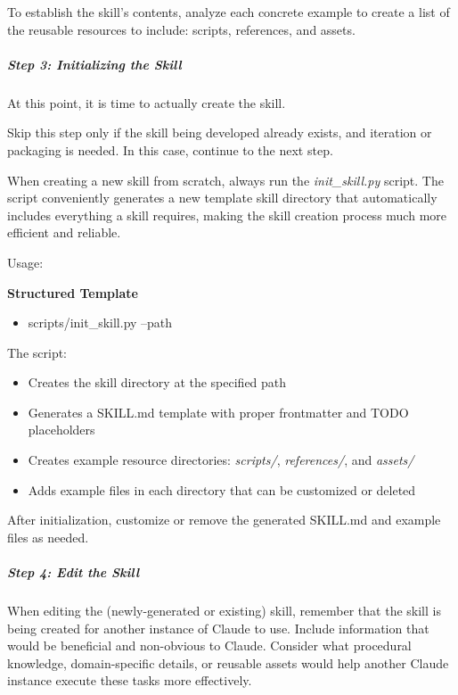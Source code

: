 \documentclass[11pt]{article}
\begin{document}
To establish the skill's contents, analyze each concrete example to create a list of the reusable resources to include: scripts, references, and assets.


\subparagraph{Step 3: Initializing the Skill}\mbox{}\par

At this point, it is time to actually create the skill.


Skip this step only if the skill being developed already exists, and iteration or packaging is needed. In this case, continue to the next step.


When creating a new skill from scratch, always run the \emph{init\_\allowbreak{}skill.py} script. The script conveniently generates a new template skill directory that automatically includes everything a skill requires, making the skill creation process much more efficient and reliable.


Usage:


\textbf{Structured Template}
\begin{itemize}[leftmargin=*,itemsep=2pt,topsep=2pt]
\item {} scripts/init\_\allowbreak{}skill.py --path
\end{itemize}

The script:


\begin{itemize}[leftmargin=*,itemsep=2pt,topsep=2pt]
\item {} Creates the skill directory at the specified path
\item {} Generates a SKILL.md template with proper frontmatter and TODO placeholders
\item {} Creates example resource directories: \emph{scripts/}, \emph{references/}, and \emph{assets/}
\item {} Adds example files in each directory that can be customized or deleted
\end{itemize}

After initialization, customize or remove the generated SKILL.md and example files as needed.


\subparagraph{Step 4: Edit the Skill}\mbox{}\par

When editing the (newly-generated or existing) skill, remember that the skill is being created for another instance of Claude to use. Include information that would be beneficial and non-obvious to Claude. Consider what procedural knowledge, domain-specific details, or reusable assets would help another Claude instance execute these tasks more effectively.
\end{document}
